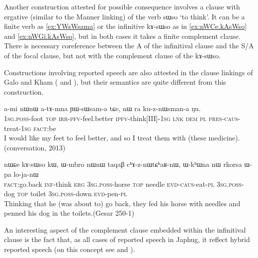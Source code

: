 \documentclass[oldfontcommands,oneside,a4paper,11pt]{article}
\newcommand{\ipa}[1]{{\phon \mbox{#1}}} %
\begin{document}
 Another construction attested for possible consequence involves a clause with ergative (similar to the Manner linking) of the verb \ipa{sɯso} `to think'. It can be a finite verb as \ref{ex:YWsWsama} or the infinitive \ipa{kɤ-sɯso} as in \ref{ex:nWCe.kAsWso} and \ref{ex:nWGi.kAsWso}, but in both cases it  takes a finite complement clause.  There is necessary coreference between the A of the infinitival clause and the S/A of the focal clause, but not with the complement clause of the  \ipa{kɤ-sɯso}. 
 
 Constructions involving reported speech are also attested in the clause linkings  of Galo and Kham  (\citealt[86, 88]{post09linking} and \citealt[110]{watters09kham}), but their semantics are quite different from this construction.
 
   \begin{exe}
\ex \label{ex:YWsWsama}
\gll 
\ipa{a-mi}  	\ipa{nɯnɯ}  	\ipa{a-tɤ-mna}  	\ipa{ɲɯ-sɯsam-a}  	\ipa{tɕe,}  	\ipa{nɯ} \ipa{ra}  	\ipa{ku-z-nɯsman-a}  	\ipa{ŋu.}   \\
\textsc{1sg.poss}-foot \textsc{top} \textsc{irr-pfv}-feel.better  \textsc{ipfv}-think[III]-\textsc{1sg} \textsc{lnk} \textsc{dem} \textsc{pl} \textsc{pres-caus}-treat-\textsc{1sg}  \textsc{fact}:be \\
\glt I would like my feet to feel better, and so I treat them with (these medicine). (conversation, 2013)
  \end{exe}
 
  \begin{exe}
\ex \label{ex:nWCe.kAsWso}
\gll 
\ipa{nɯɕe}  	\ipa{kɤ-sɯso}  	\ipa{kɯ,}  	\ipa{ɯ-mbro}  	\ipa{nɯnɯ}  	\ipa{taqaβ}  	\ipa{cʰɤ-z-nɯtɕʰaʁ-nɯ,}  	\ipa{ɯ-kʰɯna}  	\ipa{nɯ}  	\ipa{rkorsa}  	\ipa{ɯ-pa}  	\ipa{lo-ja-nɯ}  \\
\textsc{fact}:go.back \textsc{inf}-think \textsc{erg} \textsc{3sg.poss}-horse \textsc{top} needle \textsc{evd-caus}-eat-\textsc{pl}   \textsc{3sg.poss}-dog \textsc{top} toilet \textsc{3sg.poss}-down \textsc{evd}-pen-\textsc{pl} \\
\glt Thinking that he (was about to) go back, they fed his horse with needles and penned his dog in the toilets.(Gesar 250-1)
 \end{exe}
 
An interesting aspect  of the complement clause embedded within the infinitival clause is the fact that, as all cases of reported speech in Japhug, it reflect hybrid reported speech (on this concept see \citealt{tournadre08conjunct} and \citealt{aikhenvald08semidirect}).
 
\end{document}
